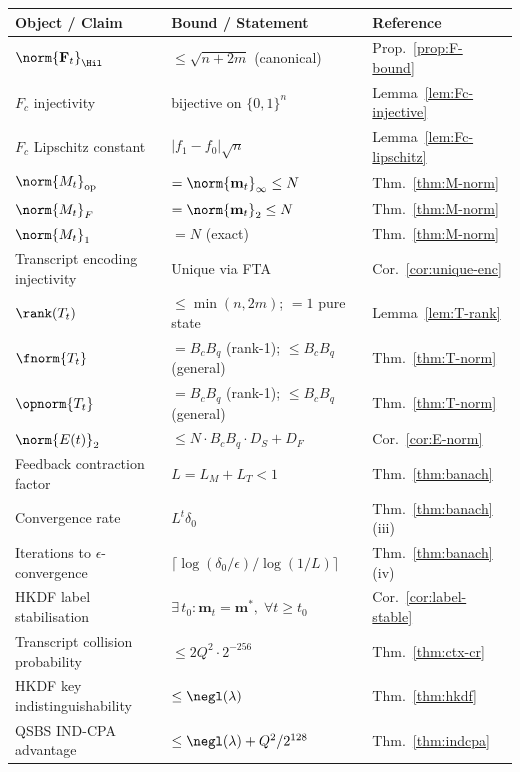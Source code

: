 \documentclass[11pt,letterpaper]{article}
\begin{document}
\begin{center}
\renewcommand{\arraystretch}{1.45}
\setlength{\tabcolsep}{7pt}
\begin{longtable}{@{}>{\small}l>{\small}l>{\small}l@{}}
\toprule
\rowcolor{mfblue!15}
\textbf{Object / Claim} & \textbf{Bound / Statement} & \textbf{Reference} \\
\midrule
\endhead
$\norm{\mathbf{F}_t}_\Hil$ & $\leq \sqrt{n + 2m}$ (canonical) & Prop.~\ref{prop:F-bound} \\
$F_c$ injectivity & bijective on $\{0,1\}^n$ & Lemma~\ref{lem:Fc-injective} \\
$F_c$ Lipschitz constant & $|f_1-f_0|\sqrt{n}$ & Lemma~\ref{lem:Fc-lipschitz} \\
$\norm{M_t}_{\mathrm{op}}$ & $= \norm{\mathbf{m}_t}_\infty \leq N$ & Thm.~\ref{thm:M-norm} \\
$\norm{M_t}_{F}$ & $= \norm{\mathbf{m}_t}_2 \leq N$ & Thm.~\ref{thm:M-norm} \\
$\norm{M_t}_{1}$ & $= N$ (exact) & Thm.~\ref{thm:M-norm} \\
Transcript encoding injectivity & Unique via FTA & Cor.~\ref{cor:unique-enc} \\
$\rank(T_t)$ & $\leq \min(n,2m)$; $=1$ pure state & Lemma~\ref{lem:T-rank} \\
$\fnorm{T_t}$ & $= B_c B_q$ (rank-1); $\leq B_c B_q$ (general) & Thm.~\ref{thm:T-norm} \\
$\opnorm{T_t}$ & $= B_c B_q$ (rank-1); $\leq B_c B_q$ (general) & Thm.~\ref{thm:T-norm} \\
$\norm{E(t)}_2$ & $\leq N\cdot B_cB_q\cdot D_S + D_F$ & Cor.~\ref{cor:E-norm} \\
Feedback contraction factor & $L = L_M + L_T < 1$ & Thm.~\ref{thm:banach} \\
Convergence rate & $L^t \delta_0$ & Thm.~\ref{thm:banach}(iii) \\
Iterations to $\epsilon$-convergence & $\lceil\log(\delta_0/\epsilon)/\log(1/L)\rceil$ & Thm.~\ref{thm:banach}(iv) \\
HKDF label stabilisation & $\exists\, t_0: \mathbf{m}_t = \mathbf{m}^*,\;\forall t\geq t_0$ & Cor.~\ref{cor:label-stable} \\
Transcript collision probability & $\leq 2Q^2\cdot 2^{-256}$ & Thm.~\ref{thm:ctx-cr} \\
HKDF key indistinguishability & $\leq\negl(\lambda)$ & Thm.~\ref{thm:hkdf} \\
QSBS IND-CPA advantage & $\leq\negl(\lambda)+Q^2/2^{128}$ & Thm.~\ref{thm:indcpa} \\

\end{longtable}
\end{center}
\end{document}
